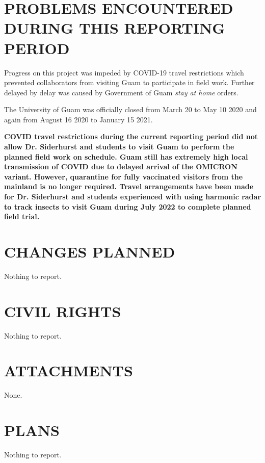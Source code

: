 \documentclass[12pt,letterpaper,english,bibliography=totocnumbered,abstract=on]{scrartcl}
\begin{document}
\section{PROBLEMS ENCOUNTERED DURING THIS REPORTING PERIOD}
\label{impediments}


Progress on this project was impeded by COVID-19 travel restrictions which prevented collaborators from visiting Guam to participate in field work. Further delayed by delay was caused by Government of Guam \textit{stay at home} orders. 

The University of Guam was officially closed from March 20 to May 10 2020 and again from August 16 2020 to January 15 2021.

\textbf{COVID travel restrictions during the current reporting period did not allow Dr. Siderhurst and students to visit Guam to perform the planned field work on schedule. Guam still has extremely high local transmission of COVID due to delayed arrival of the OMICRON variant. However, quarantine for fully vaccinated visitors from the mainland is no longer required. Travel arrangements have been made for Dr. Siderhurst and students experienced with using harmonic radar to track insects to visit Guam during July 2022 to complete planned field trial.}  

\section{CHANGES PLANNED}


Nothing to report.

\section{CIVIL RIGHTS}


Nothing to report.

\section{ATTACHMENTS}


None.

\section{PLANS}


Nothing to report.
\end{document}
